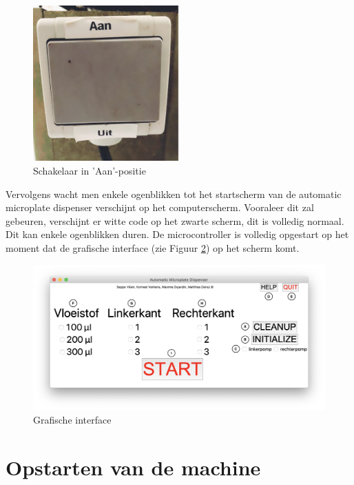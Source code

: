 \documentclass[a4paper,twoside,kulak]{kulakreport} %
\begin{document}
\begin{figure}[h]
	\centering
	\includegraphics[width=0.5\textwidth]{schakelaar.png}
	\caption{Schakelaar in 'Aan'-positie}
	\label{fig:schakelaar}
	
\end{figure} 
Vervolgens wacht men enkele ogenblikken tot het startscherm van de automatic microplate dispenser verschijnt op het computerscherm. Vooraleer dit zal gebeuren, verschijnt er witte code op het zwarte scherm, dit is volledig normaal. Dit kan enkele ogenblikken duren. De microcontroller is volledig opgestart op het moment dat de grafische interface (zie Figuur \ref{fig: GI_letters1}) op het scherm komt.
 
\begin{figure}[h]
	\centering
	\includegraphics[width=1\textwidth]{GI_letters.png}
	\caption{Grafische interface}
	\label{fig: GI_letters1}
	
\end{figure} 

\section{Opstarten van de machine}
\label{sec:initialize}
\end{document}
